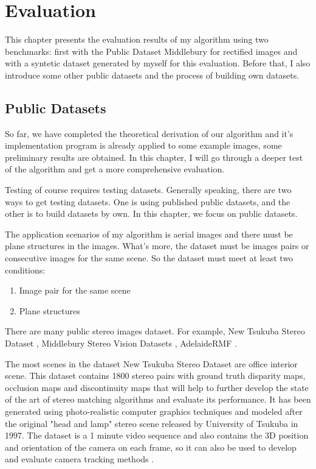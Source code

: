 \chapter{Evaluation}\label{ch:Evaluation}
This chapter presents the evaluation results of my algorithm using two benchmarks: first with the Public Dataset Middlebury \cite{scharsteinTaxonomyEvaluationDense2001} for rectified images and with a syntetic dataset generated by myself for this evaluation. Before that, I also introduce some other public datasets and the process of building own datasets. 
\section{Public Datasets}
So far, we have completed the theoretical derivation of our algorithm and it's implementation program is already applied to some example images, some preliminary results are obtained. In this chapter, I will go through a deeper test of the algorithm and get a more comprehensive evaluation.

Testing of course requires testing datasets. Generally speaking, there are two ways to get testing datasets. One is using published public datasets, and the other is to build datasets by own. In this chapter, we focus on public datasets.

The application scenarios of my algorithm is aerial images and there must be plane structures in the images. What's more, the dataset must be images pairs or consecutive images for the same scene. So the dataset must meet at least two conditions:
\begin{enumerate}
	\item Image pair for the same scene
	\item Plane structures
\end{enumerate}

There are many public stereo images dataset. For example, New Tsukuba Stereo Dataset \cite{nakamuraOcclusionDetectableStereoocclusion1996}, Middlebury Stereo Vision Datasets \cite{scharsteinTaxonomyEvaluationDense2001}, AdelaideRMF \cite{wongDynamicHierarchicalMultistructure2011}.

 The most scenes in the dataset New Tsukuba Stereo Dataset are office interior scene. This dataset contains 1800 stereo pairs with ground truth disparity maps, occlusion maps and discontinuity maps that will help to further develop the state of the art of stereo matching algorithms and evaluate its performance. It has been generated using photo-realistic computer graphics techniques and modeled after the original "head and lamp" stereo scene released by University of Tsukuba in 1997. The dataset is a 1 minute video sequence and also contains the 3D position and orientation of the camera on each frame, so it can also be used to develop and evaluate camera tracking methods \cite{nakamuraOcclusionDetectableStereoocclusion1996}.


